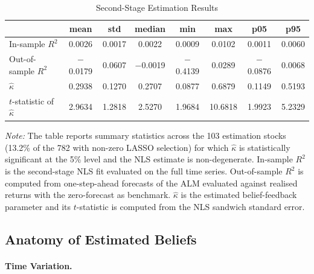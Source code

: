 \begin{table}[H]
\centering
\caption{Second-Stage Estimation Results}
\label{tab:summary_stats_stage2}
\begin{tabularx}{\textwidth}{@{}>{{\small}}Xccccccc@{}}
\toprule
 & mean & std & median & min & max & p05 & p95 \\
\midrule
In-sample $R^2$        & 0.0026 & 0.0017 & 0.0022 & 0.0009 & 0.0102 & 0.0011 & 0.0060 \\
Out-of-sample $R^2$    & $-$0.0179 & 0.0607 & $-$0.0019 & $-$0.4139 & 0.0289 & $-$0.0876 & 0.0068 \\
$\hat{\kappa}$         & 0.2938 & 0.1270 & 0.2707 & 0.0877 & 0.6879 & 0.1149 & 0.5193 \\
$t$-statistic of $\hat{\kappa}$ & 2.9634 & 1.2818 & 2.5270 & 1.9684 & 10.6818 & 1.9923 & 5.2329 \\
\bottomrule
\end{tabularx}
\medskip
\begin{minipage}{0.95\textwidth}
\footnotesize
\vspace{0.2cm}
\textit{Note:} The table reports summary statistics across the 103 estimation stocks (13.2\% of the 782 with non-zero LASSO selection) for which $\hat\kappa$ is statistically significant at the 5\% level and the NLS estimate is non-degenerate.
In-sample $R^2$ is the second-stage NLS fit evaluated on the full time series.
Out-of-sample $R^2$ is computed from one-step-ahead forecasts of the ALM evaluated against realised returns with the zero-forecast as benchmark.
$\hat{\kappa}$ is the estimated belief-feedback parameter and its $t$-statistic is computed from the NLS sandwich standard error.
\end{minipage}
\end{table}


\subsection{Anatomy of Estimated Beliefs}\label{subsec:empirical_belief_anatomy}

\paragraph{Time Variation.}

